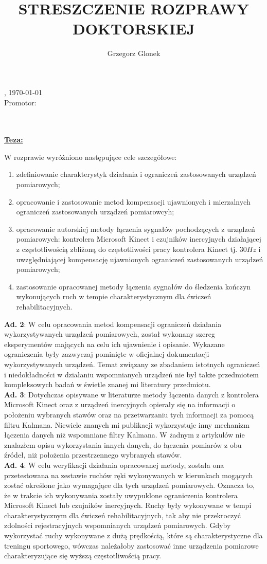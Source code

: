\documentclass[10pt,a4paper]{report}
\author{Grzegorz Glonek}
\title{STRESZCZENIE ROZPRAWY DOKTORSKIEJ}
\makeatletter
\newcommand*{\makeheader}{
	\begin{FlushLeft}
		\@studentTitle{} \@studentFirstname{} \@studentLastname{} \hfill 	\@location{}, \today \\					
		Promotor: \@supervisorTitle{} \@supervisorFirstname{} \@supervisorLastname{} 
	\end{FlushLeft}
	
	\vspace*{2cm}
	\Centering
	\@title{}\\
	\vspace*{0.5cm}
	\textbf{\@thesisTitle{}}\\
	
	\vspace*{1.5cm}
	\justify
	\textbf{\underline{Teza:}} \textbf{\@thesis{}}
}
\makeatother
\begin{document}
	
	\makeheader
	\begin{FlushLeft}
	W rozprawie wyróżniono następujące cele szczegółowe:
	\begin{enumerate}[1. ]
		\item zdefiniowanie charakterystyk działania i ograniczeń zastosowanych urządzeń pomiarowych;
	
		\item opracowanie i zastosowanie metod kompensacji ujawnionych i mierzalnych ograniczeń zastosowanych urządzeń pomiarowcyh;
			\item opracowanie autorskiej metody łączenia sygnałów pochodzących z urządzeń pomiarowych: kontrolera Microsoft Kinect i czujników inercyjnych działającej z częstotliwością zbliżoną do częstotliwości pracy kontrolera Kinect tj. $30Hz$ i uwzględniającej kompensację ujawnionych ograniczeń zastosowanych urządzeń pomiarowych;		
		\item zastosowanie opracowanej metody łączenia sygnałów do śledzenia kończyn wykonujących ruch w tempie charakterystycznym dla ćwiczeń rehabilitacyjnych.
	\end{enumerate}
\textbf{Ad. 2}: W celu opracowania metod kompensacji ograniczeń działania wykorzystywanych urządzeń pomiarowych, został wykonany szereg eksperymentów mających na celu ich ujawnienie i opisanie. Wykazane ograniczenia były zazwyczaj pominięte w oficjalnej dokumentacji wykorzystywanych urządzeń. Temat związany ze zbadaniem istotnych ograniczeń i niedokładności w działaniu wspomnianych urządzeń nie był także przedmiotem kompleksowych badań w świetle znanej mi literatury przedmiotu. \\

\textbf{Ad. 3}: Dotychczas opisywane w literaturze metody łączenia danych z kontrolera Microsoft Kinect oraz z urządzeń inercyjnych opierały się na informacji o położeniu wybranych stawów oraz na przetwarzaniu tych informacji za pomocą filtru Kalmana. Niewiele znanych mi publikacji wykorzystuje inny mechanizm łączenia danych niż wspomniane filtry Kalmana. W żadnym z artykulów nie znalazłem opisu wykorzystania innych danych, do łączenia pomiarów z obu źródeł, niż położenia przestrzennego wybranych stawów. \\

\textbf{Ad. 4}: W celu weryfikacji działania opracowanej metody, została ona przetestowana na zestawie ruchów ręki wykonywanych w kierunkach mogących zostać określone jako wymagające dla tych urządzeń pomiarowych. Oznacza to, że w trakcie ich wykonywania zostały uwypuklone ograniczenia kontrolera Microsoft Kinect lub czujników inercyjnych. Ruchy były wykonywane w tempi charakterystycznym dla ćwiczeń rehabilitacyjnych, tak aby nie przekroczyć zdolności rejestracyjnych wspomnianych urządzeń pomiarowych. Gdyby wykorzystać ruchy wykonywane z dużą prędkością, które są charakterystyczne dla treningu sportowego, wówczas należałoby zastosować inne urządzenia pomiarowe charakteryzujące się wyższą częstotliwością pracy. \\


\end{FlushLeft}
\end{document}
